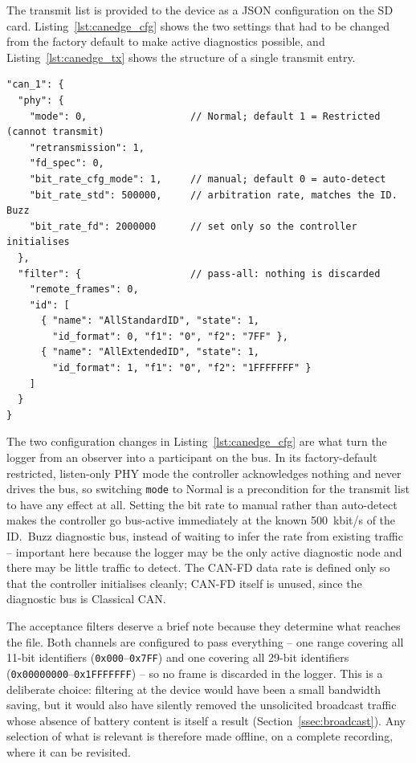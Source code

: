 \documentclass[11pt,a4paper,oneside,parskip=half]{scrreprt}
\providecommand{\hex}{}\renewcommand{\hex}[1]{\texttt{0x#1}}
\begin{document}
The transmit list is provided to the device as a JSON configuration on the SD card. Listing~\ref{lst:canedge_cfg} shows the two settings that had to be changed from the factory default to make active diagnostics possible, and Listing~\ref{lst:canedge_tx} shows the structure of a single transmit entry.

\begin{lstlisting}[float=htbp,caption={CANedge2 PHY configuration changes required for UDS transmission. The factory default is restricted (listen-only) PHY mode with auto bit-rate detection, which never lets the controller transmit.},label={lst:canedge_cfg}]
"can_1": {
  "phy": {
    "mode": 0,                  // Normal; default 1 = Restricted (cannot transmit)
    "retransmission": 1,
    "fd_spec": 0,
    "bit_rate_cfg_mode": 1,     // manual; default 0 = auto-detect
    "bit_rate_std": 500000,     // arbitration rate, matches the ID. Buzz
    "bit_rate_fd": 2000000      // set only so the controller initialises
  },
  "filter": {                   // pass-all: nothing is discarded
    "remote_frames": 0,
    "id": [
      { "name": "AllStandardID", "state": 1,
        "id_format": 0, "f1": "0", "f2": "7FF" },
      { "name": "AllExtendedID", "state": 1,
        "id_format": 1, "f1": "0", "f2": "1FFFFFFF" }
    ]
  }
}
\end{lstlisting}

The two configuration changes in Listing~\ref{lst:canedge_cfg} are what turn the logger from an observer into a participant on the bus. In its factory-default restricted, listen-only PHY mode the controller acknowledges nothing and never drives the bus, so switching \texttt{mode} to Normal is a precondition for the transmit list to have any effect at all. Setting the bit rate to manual rather than auto-detect makes the controller go bus-active immediately at the known 500~kbit/s of the ID.~Buzz diagnostic bus, instead of waiting to infer the rate from existing traffic -- important here because the logger may be the only active diagnostic node and there may be little traffic to detect. The CAN-FD data rate is defined only so that the controller initialises cleanly; CAN-FD itself is unused, since the diagnostic bus is Classical CAN.

The acceptance filters deserve a brief note because they determine what reaches the file. Both channels are configured to pass everything -- one range covering all 11-bit identifiers (\hex{000}--\hex{7FF}) and one covering all 29-bit identifiers (\hex{00000000}--\hex{1FFFFFFF}) -- so no frame is discarded in the logger. This is a deliberate choice: filtering at the device would have been a small bandwidth saving, but it would also have silently removed the unsolicited broadcast traffic whose absence of battery content is itself a result (Section~\ref{ssec:broadcast}). Any selection of what is relevant is therefore made offline, on a complete recording, where it can be revisited.
\end{document}
